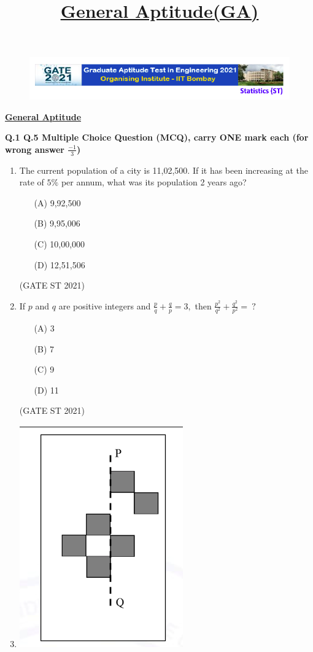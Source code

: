 \documentclass[journal,12pt,onecolumn]{IEEEtran}
\title{\textbf{\underline{General Aptitude(GA)}}}
\author{}
\date{}
\theoremstyle{remark}
\begin{document}
\begin{figure}
 \centering
    \includegraphics[width=1\linewidth]{figs/0.png} 
\end{figure}

\textbf{\underline{General Aptitude}}

\textbf{Q.1 \text{-} Q.5 Multiple Choice Question (MCQ), carry ONE mark each (for wrong answer $\frac{-1}{3}$)}
\begin{enumerate}
\item 
The current population of a city is 11,02,500. If it has been increasing at the rate of $5\%$ per annum, what was its population 2 years ago?

\begin{enumerate}
\item[(A)] 9,92,500
\item[(B)] 9,95,006
\item[(C)] 10,00,000
\item[(D)] 12,51,506
\end{enumerate}

\hfill (GATE ST 2021)\\

\item If $p$ and $q$ are positive integers and
$
\frac{p}{q} + \frac{q}{p} = 3,
$
then
$
\frac{p^{2}}{q^{2}} + \frac{q^{2}}{p^{2}} = \ ?
$
\begin{enumerate}
\item[(A)] 3
\item[(B)] 7
\item[(C)] 9
\item[(D)] 11
\end{enumerate}

\hfill (GATE ST 2021) \\

\item  
\includegraphics[width=0.2\linewidth]{figs/3.png} 



\end{enumerate}
\end{document}
